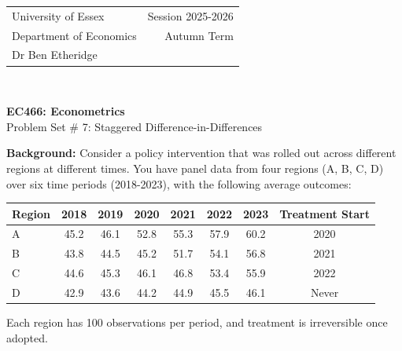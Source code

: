 \documentclass[12pt,a4paper]{article}
\begin{document}
\begin{tabular}{l r}
University of Essex  \hspace{35ex}& Session 2025-2026 \\
Department of Economics \hspace{35ex} & Autumn Term\\
Dr Ben Etheridge \hspace{35ex} &
\end{tabular}
\\
\begin{center}
\large{\textbf{EC466: Econometrics }\\
Problem Set \# 7: Staggered Difference-in-Differences}
\end{center}
\vspace*{0.5cm}

\textbf{Background:} Consider a policy intervention that was rolled out across different regions at different times. You have panel data from four regions (A, B, C, D) over six time periods (2018-2023), with the following average outcomes:

\vspace{1em}
\begin{center}
\begin{tabular}{lcccccc|c}
\hline
Region & 2018 & 2019 & 2020 & 2021 & 2022 & 2023 & Treatment Start \\
\hline
A & 45.2 & 46.1 & 52.8 & 55.3 & 57.9 & 60.2 & 2020 \\
B & 43.8 & 44.5 & 45.2 & 51.7 & 54.1 & 56.8 & 2021 \\
C & 44.6 & 45.3 & 46.1 & 46.8 & 53.4 & 55.9 & 2022 \\
D & 42.9 & 43.6 & 44.2 & 44.9 & 45.5 & 46.1 & Never \\
\hline
\end{tabular}
\end{center}
Each region has 100 observations per period, and treatment is irreversible once adopted.
\vspace{1em}
\end{document}
